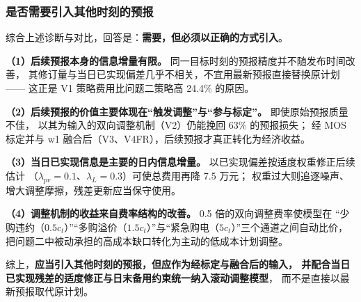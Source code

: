 \subsubsection{是否需要引入其他时刻的预报}
综合上述诊断与对比，回答是：\textbf{需要，但必须以正确的方式引入}。

\textbf{（1）后续预报本身的信息增量有限。} 同一目标时刻的预报精度并不随发布时间改善，
其修订量与当日已实现偏差几乎不相关，不宜用最新预报直接替换原计划——
这正是 V1 策略费用比问题二策略高 24.4\% 的原因。

\textbf{（2）后续预报的价值主要体现在“触发调整”与“参与标定”。} 即使原始预报质量不佳，
以其为输入的双向调整机制（V2）仍能挽回 63\% 的预报损失；
经 MOS 标定并与 w1 融合后（V3、V4FR），后续预报才真正转化为经济收益。

\textbf{（3）当日已实现信息是主要的日内信息增量。} 以已实现偏差按适度权重修正后续估计
（$\lambda_{pv}=0.1$、$\lambda_L=0.3$）可使总费用再降 7.5 万元；
权重过大则追逐噪声、增大调整摩擦，残差更新应当保守使用。

\textbf{（4）调整机制的收益来自费率结构的改善。} 0.5 倍的双向调整费率使模型在
“少购违约（$0.5c_t$）”“多购溢价（$1.5c_t$）”与“紧急购电（$5c_t$）”三个通道之间自动比价，
把问题二中被动承担的高成本缺口转化为主动的低成本计划调整。

综上，\textbf{应当引入其他时刻的预报，但应作为经标定与融合后的输入，
并配合当日已实现残差的适度修正与日末备用约束统一纳入滚动调整模型}，
而不是直接以最新预报取代原计划。
